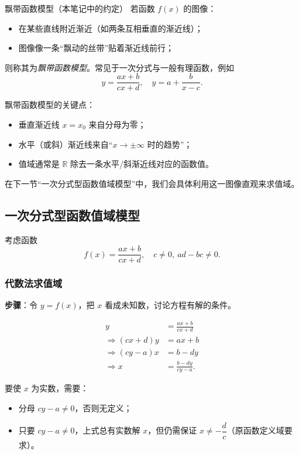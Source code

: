 \documentclass[a4paper,11pt]{ctexart}
\begin{document}
\begin{definitionbox}{飘带函数模型（本笔记中的约定）}
  若函数 $f(x)$ 的图像：
  \begin{itemize}
    \item 在某些直线附近渐近（如两条互相垂直的渐近线）；
    \item 图像像一条“飘动的丝带”贴着渐近线前行；
  \end{itemize}
  则称其为\emph{飘带函数模型}。常见于一次分式与一般有理函数，例如
  \[
    y = \frac{ax+b}{cx+d},\quad
    y = a + \frac{b}{x-c}.
  \]
\end{definitionbox}

飘带函数模型的关键点：

\begin{itemize}
  \item 垂直渐近线 $x=x_0$ 来自分母为零；
  \item 水平（或斜）渐近线来自“$x\to\pm\infty$ 时的趋势”；
  \item 值域通常是 $\mathbb{R}$ 除去一条水平/斜渐近线对应的函数值。
\end{itemize}

在下一节“一次分式型函数值域模型”中，我们会具体利用这一图像直观来求值域。

\subsection{一次分式型函数值域模型}

考虑函数
\[
  f(x) = \frac{ax+b}{cx+d},\quad c\ne0,\ ad-bc\ne0.
\]

\subsubsection{代数法求值域}

\textbf{步骤}：令 $y=f(x)$，把 $x$ 看成未知数，讨论方程有解的条件。

\begin{align*}
  y &= \frac{ax+b}{cx+d} \\
  \Rightarrow (cx+d)y &= ax + b \\
  \Rightarrow (cy-a)x &= b - dy \\
  \Rightarrow x &= \frac{b-dy}{cy-a}.
\end{align*}

要使 $x$ 为实数，需要：

\begin{itemize}
  \item 分母 $cy-a\ne0$，否则无定义；
  \item 只要 $cy-a\ne0$，上式总有实数解 $x$，但仍需保证 $x\ne -\dfrac{d}{c}$（原函数定义域要求）。
\end{itemize}
\end{document}
